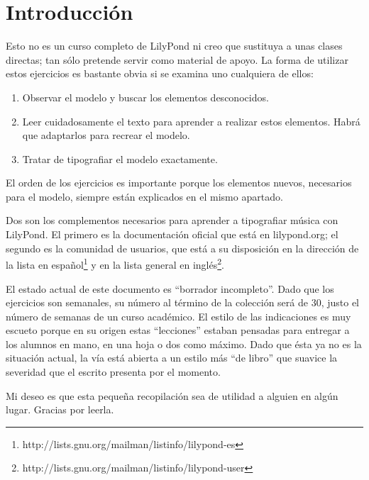 \section*{Introducción}

Esto no es un curso completo de LilyPond ni creo que sustituya a unas
clases directas; tan sólo pretende servir como material de apoyo. La
forma de utilizar estos ejercicios es bastante obvia si se examina uno
cualquiera de ellos:

\begin{enumerate}
\item Observar el modelo y buscar los elementos desconocidos.

\item Leer cuidadosamente el texto para aprender a realizar estos
  elementos.  Habrá que adaptarlos para recrear el modelo.

\item Tratar de tipografiar el modelo exactamente.

\end{enumerate}

El orden de los ejercicios es importante porque los elementos nuevos,
necesarios para el modelo, siempre están explicados en el mismo
apartado.

Dos son los complementos necesarios para aprender a tipografiar música
con LilyPond.  El primero es la documentación oficial que está en
lilypond.org; el segundo es la comunidad de usuarios, que está a su
disposición en la dirección de la lista en
español\footnote{http://lists.gnu.org/mailman/listinfo/lilypond-es} y
en la lista general en
inglés\footnote{http://lists.gnu.org/mailman/listinfo/lilypond-user}.

El estado actual de este documento es ``borrador incompleto''.  Dado
que los ejercicios son semanales, su número al término de la colección
será de 30, justo el número de semanas de un curso académico.  El
estilo de las indicaciones es muy escueto porque en su origen estas
``lecciones'' estaban pensadas para entregar a los alumnos en mano, en
una hoja o dos como máximo.  Dado que ésta ya no es la situación
actual, la vía está abierta a un estilo más ``de libro'' que suavice
la severidad que el escrito presenta por el momento.


Mi deseo es que esta pequeña recopilación sea de utilidad a alguien en
algún lugar.  Gracias por leerla.


